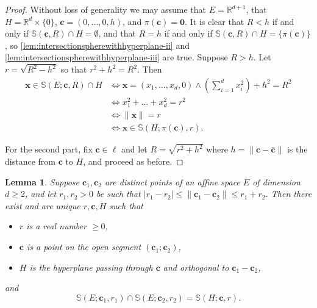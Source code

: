 \documentclass[12pt]{amsart}
\newcommand{\R}{\mathbb{R}}	%
\newcommand{\IFF}{\Leftrightarrow}
\newcommand{\set}[1]{\mathopen \{ {#1} \mathclose \}} %
\newcommand{\card}[1]{\mathopen | #1 \mathclose |}		%
\theoremstyle{plain}
\newtheorem{lemma}[theorem]{Lemma}
\theoremstyle{definition}
\theoremstyle{remark}
\begin{document}
\begin{proof}
Without loss of generality we may assume that \( E = \R^{ d + 1 } \), that \( H = \R^d \times \set{0} \), \( \mathbf{c} = ( 0 , \dots , 0 , h ) \), and \( \pi ( \mathbf{c} ) = \mathbf{0} \).
It is clear that \( R < h \) if and only if \( \mathbb{S} ( \mathbf{c} , R ) \cap H = \emptyset \), and that \( R = h \) if and only if \( \mathbb{S} ( \mathbf{c} , R ) \cap H = \set{\pi ( \mathbf{c} ) } \), so \ref{lem:intersectionspherewithhyperplane-ii} and \ref{lem:intersectionspherewithhyperplane-iii} are true.
Suppose \( R > h \).
Let \( r = \sqrt{ R^2 - h^2 } \) so that \( r^2 + h^2 = R^2 \).
Then 
\[
\begin{split}
 \mathbf{x} \in \mathbb{S} ( E ; \mathbf{c} , R ) \cap H & \IFF \mathbf{x} = ( x_1 , \dots , x_d , 0 ) \wedge ( \textstyle \sum_{i =1}^d x_i^2 ) + h^2 = R^2
\\
 & \IFF x_1^2 + \dots + x_d ^2 = r^2 
 \\
 & \IFF \| \mathbf{x} \| = r 
\\
 & \IFF \mathbf{x} \in \mathbb{S} ( H ; \pi ( \mathbf{c} ) , r ) . 
\end{split}
\]

For the second part, fix \( \mathbf{c} \in \ell \) and let \( R = \sqrt{ r^2 + h^2 } \) where \( h = \| \mathbf{c} - \bar{ \mathbf{c}} \| \) is the distance from \( \mathbf{c} \) to \( H \), and proceed as before.
\end{proof}

\begin{lemma}\label{lem:intersectionoftwospheres}
Suppose \( \mathbf{c}_1 , \mathbf{c}_2 \) are distinct points of an affine space \( E \) of dimension \( d \geq 2 \), and let \( r_1 , r_2 > 0 \) be such that \( \card{ r_1 - r_2 } \leq \| \mathbf{c}_1 - \mathbf{c}_2 \| \leq r_1 + r_2 \).
Then there exist and are unique \( r , \mathbf{c} , H \) such that 
\begin{itemize}
\item
\( r \) is a real number \( \geq 0 \),
\item
\( \mathbf{c} \) is a point on the open segment \( ( \mathbf{c}_1 ; \mathbf{c}_2 ) \), 
\item
\( H \) is the hyperplane passing through \( \mathbf{c} \) and orthogonal to \( \mathbf{c}_1 - \mathbf{c}_2 \),
\end{itemize}
and
\[ 
\mathbb{S} ( E ; \mathbf{c}_1 , r_1 ) \cap \mathbb{S} ( E ; \mathbf{c}_2 , r_2 ) = \mathbb{S} ( H ; \mathbf{c} , r ) .
\]
\end{lemma}
\end{document}
